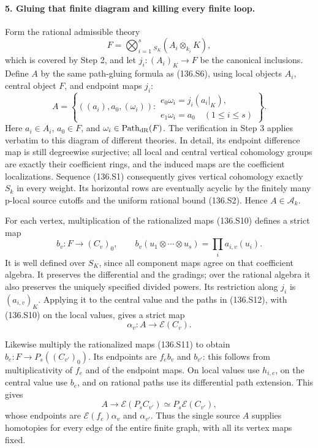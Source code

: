 \paragraph{5. Gluing that finite diagram and killing every finite loop.}
Form the rational admissible theory
\[
                    F=\bigotimes_{i=1}^s{}_{S_K}(A_i\otimes_{k_i}K),
\]
which is covered by Step 2, and let $j_i:(A_i)_K\to F$
be the canonical inclusions. Define $A$ by the same
path-gluing formula as (136.S6), using local objects
$A_i$, central object $F$, and endpoint maps $j_i$:
\[
 A=\left\{((a_i),a_0,(\omega_i)):
     \begin{array}{l}
       e_0\omega_i=j_i(a_i|_K),\\
       e_1\omega_i=a_0\quad(1\le i\le s)
     \end{array}\right\}.                                 \tag{136.S12}
\]
Here $a_i\in A_i$, $a_0\in F$, and
$\omega_i\in\operatorname{Path}_{\rm dR}(F)$.
The verification in Step 3 applies verbatim to this
diagram of different theories. In detail, its endpoint
difference map is still degreewise surjective; all
local and central vertical cohomology groups are
exactly their coefficient rings, and the induced
maps are the coefficient localizations. Sequence
(136.S1) consequently gives vertical cohomology
exactly $S_k$ in every weight. Its horizontal rows
are eventually acyclic by the finitely many p-local
source cutoffs and the uniform rational bound (136.S2).
Hence $A\in\mathcal A_k$.

For each vertex, multiplication of the rationalized
maps (136.S10) defines a strict map
\[
        b_v:F\longrightarrow(C_v)_0,\qquad
        b_v(u_1\otimes\cdots\otimes u_s)
                   =\prod_i a_{i,v}(u_i).
\]
It is well defined over $S_K$, since all component
maps agree on that coefficient algebra. It preserves
the differential and the gradings; over the rational
algebra it also preserves the uniquely specified
divided powers. Its restriction along $j_i$ is
$(a_{i,v})_K$. Applying it to the central value and
the paths in (136.S12), with (136.S10) on the local
values, gives a strict map
\[
                         \alpha_v:A\longrightarrow\mathcal E(C_v).
                                                               \tag{136.S13}
\]

Likewise multiply the rationalized maps (136.S11)
to obtain $b_e:F\to P_s((C_{v'})_0)$. Its endpoints
are $f_eb_v$ and $b_{v'}$: this follows from
multiplicativity of $f_e$ and of the endpoint maps.
On local values use $h_{i,e}$, on the central value
use $b_e$, and on rational paths use its differential
path extension. This gives
\[
 A\longrightarrow\mathcal E(P_s C_{v'})
                         \simeq P_s\mathcal E(C_{v'}),
\]
whose endpoints are $\mathcal E(f_e)\alpha_v$ and
$\alpha_{v'}$. Thus the single source $A$ supplies
homotopies for every edge of the entire finite graph,
with all its vertex maps fixed.

